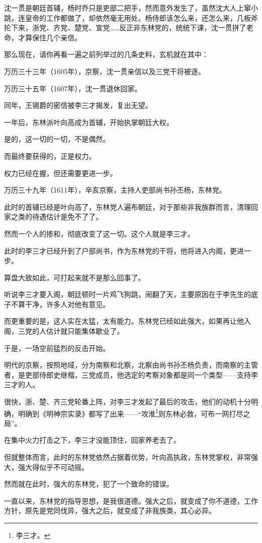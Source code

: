 \begin{multicols}{\theparacolNo}
沈一贯是朝廷首辅，杨时乔只是吏部二把手，然而意外发生了，虽然沈大人上窜小跳，连皇帝的工作都做了，却依然毫无用处。杨侍郎该怎么来，还怎么来，几板斧抡下来，浙党、齐党、楚党、宣党……反正非东林党的，统统下课，沈一贯拼了老命，才算保住几个亲信。

那么现在，请你再看一遍之前列举过的几条史料，玄机就在其中：

万历三十三年（1605年），京察，沈一贯亲信以及三党干将被逐。

万历三十五年（1607年），沈一贯退休回家。

同年，王锡爵的密信被李三才揭发，复出无望。

一年后，东林派叶向高成为首辅，开始执掌朝廷大权。

是的，这一切的一切，不是偶然。

而最终要获得的，正是权力。

权力已经在握，但还需要更进一步。

万历三十九年（1611年），辛亥京察，主持人吏部尚书孙丕杨，东林党。

此时的首辅已经是叶向高了，东林党人遍布朝廷，对于那些非我族群而言，清理回家之类的待遇估计是免不了了。

然而一个人的掺和，彻底改变了这一切。这个人就是李三才。

此时的李三才已经升到了户部尚书，作为东林党的干将，他将进入内阁，更进一步。

算盘大致如此，可打起来就不是那么回事了。

听说李三才要入阁，朝廷顿时一片鸡飞狗跳，闹翻了天，主要原因在于李先生的底子不算干净，许多人对他有意见。

而更重要的是，这人实在太猛，太有能力。东林党已经如此强大，如果再让他入阁，三党的人估计就只能集体歇业了。

于是，一场空前猛烈的反击开始。

明代的京察，按照地域，分为南察和北察，北察由尚书孙丕杨负责，而南察的主管者，是吏部侍郎史继楷，三党成员，他选定的考察对象都是同一个类型——支持李三才的人。

很快，浙、楚、齐三党轮番上阵，对李三才发起了最后的攻击，他们的动机十分明确，明确到《明神宗实录》都写了出来——“攻淮\footnote{李三才。}则东林必救，可布一网打尽之局”。

在集中火力打击之下，李三才没能顶住，回家养老去了。

但就整体而言，此时的东林党依然占据着优势，叶向高执政，东林党掌权，非常强大，强大得似乎不可动摇。

然而就在此时，强大的东林党，犯了一个致命的错误。

一直以来，东林党的指导思想，是我很道德。强大之后，就变成了你不道德，工作方针，原先是党同伐异，强大之后，就变成了非我族类，其心必异。


\end{multicols}
